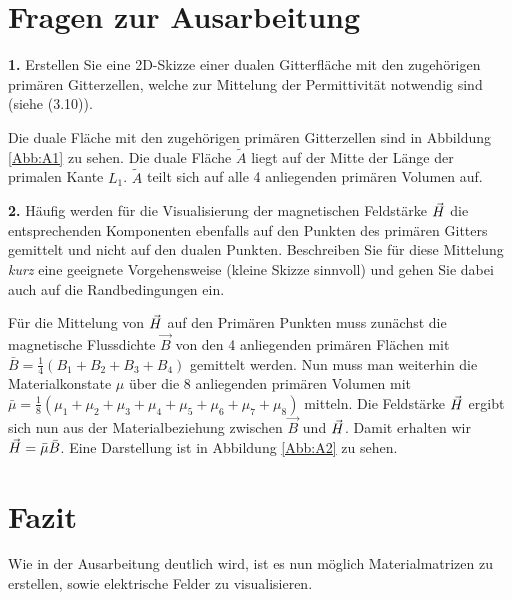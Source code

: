 \documentclass[Protokollheft.tex]{subfiles}
\begin{document}
\section{Fragen zur Ausarbeitung}

	\begin{framed}
	\noindent \textbf{1.} Erstellen Sie eine 2D-Skizze einer dualen
	Gitterfläche mit den zugehörigen primären Gitterzellen, welche
    zur Mittelung der Permittivität notwendig sind (siehe (3.10)).\label{exer:averagingEps}
\end{framed}
\noindent
Die duale Fläche mit den zugehörigen primären Gitterzellen sind in Abbildung \ref{Abb:A1} zu sehen. Die duale Fläche $\tilde{A}$ liegt auf der Mitte der Länge der primalen Kante $L_1$. $\tilde{A}$ teilt sich auf alle 4 anliegenden primären Volumen auf.


	\begin{framed}
	\noindent \textbf{2.} Häufig werden für die Visualisierung der magnetischen Feldstärke
	$ \vec{H} $ die entsprechenden Komponenten ebenfalls auf den Punkten des
	primären Gitters gemittelt und nicht auf den dualen
	Punkten. Beschreiben Sie für diese Mittelung \emph{kurz} eine geeignete Vorgehensweise (kleine Skizze sinnvoll)
	und gehen Sie dabei auch auf die Randbedingungen ein.\label{exer:averageHfield}
\end{framed}
\noindent
Für die Mittelung von $ \vec{H} $ auf den Primären Punkten muss zunächst die magnetische Flussdichte $\vec{B}$ von den 4 anliegenden primären Flächen mit $\bar{B}=\frac{1}{4}(B_1+B_2+B_3+B_4)$ gemittelt werden. Nun muss man weiterhin die Materialkonstate $\mu$ über die 8 anliegenden primären Volumen mit $\bar{\mu}=\frac{1}{8}(\mu_1+\mu_2+\mu_3+\mu_4+\mu_5+\mu_6+\mu_7+\mu_8)$ mitteln. Die Feldstärke $ \vec{H} $ ergibt sich nun aus der Materialbeziehung zwischen $\vec{B}$ und $ \vec{H} $. Damit erhalten wir $ \vec{H} =\bar{\mu}\bar{B}$. Eine Darstellung ist in Abbildung \ref{Abb:A2} zu sehen.

\section{Fazit}
Wie in der Ausarbeitung deutlich wird, ist es nun möglich Materialmatrizen zu erstellen, sowie elektrische Felder zu visualisieren.
\end{document}
